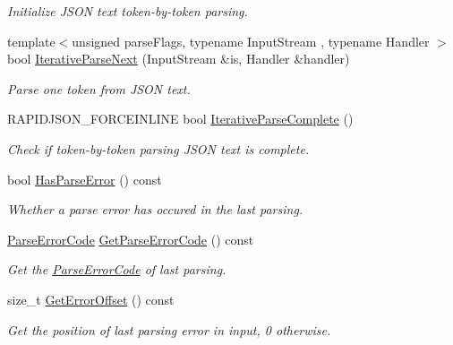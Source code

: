 \begin{DoxyCompactItemize}
\begin{DoxyCompactList}\small\item\em Initialize J\+S\+ON text token-\/by-\/token parsing. \end{DoxyCompactList}\item 
{\footnotesize template$<$unsigned parse\+Flags, typename Input\+Stream , typename Handler $>$ }\\bool \hyperlink{classGenericReader_a257891331e0c259903e7066fb4cebf92}{Iterative\+Parse\+Next} (Input\+Stream \&is, Handler \&handler)
\begin{DoxyCompactList}\small\item\em Parse one token from J\+S\+ON text. \end{DoxyCompactList}\item 
R\+A\+P\+I\+D\+J\+S\+O\+N\+\_\+\+F\+O\+R\+C\+E\+I\+N\+L\+I\+NE bool \hyperlink{classGenericReader_a835802fb87b44a09a8184785ed3b9213}{Iterative\+Parse\+Complete} ()
\begin{DoxyCompactList}\small\item\em Check if token-\/by-\/token parsing J\+S\+ON text is complete. \end{DoxyCompactList}\item 
bool \hyperlink{classGenericReader_aa9d10652062557ebf26cf414bfeabf84}{Has\+Parse\+Error} () const \hypertarget{classGenericReader_aa9d10652062557ebf26cf414bfeabf84}{}\label{classGenericReader_aa9d10652062557ebf26cf414bfeabf84}

\begin{DoxyCompactList}\small\item\em Whether a parse error has occured in the last parsing. \end{DoxyCompactList}\item 
\hyperlink{group__RAPIDJSON__ERRORS_ga8d4b32dfc45840bca189ade2bbcb6ba7}{Parse\+Error\+Code} \hyperlink{classGenericReader_ac45a26246877c4daa85021ae67caa017}{Get\+Parse\+Error\+Code} () const \hypertarget{classGenericReader_ac45a26246877c4daa85021ae67caa017}{}\label{classGenericReader_ac45a26246877c4daa85021ae67caa017}

\begin{DoxyCompactList}\small\item\em Get the \hyperlink{group__RAPIDJSON__ERRORS_ga8d4b32dfc45840bca189ade2bbcb6ba7}{Parse\+Error\+Code} of last parsing. \end{DoxyCompactList}\item 
size\+\_\+t \hyperlink{classGenericReader_a77399ac40cca1fb113a2d507f476b4e7}{Get\+Error\+Offset} () const \hypertarget{classGenericReader_a77399ac40cca1fb113a2d507f476b4e7}{}\label{classGenericReader_a77399ac40cca1fb113a2d507f476b4e7}

\begin{DoxyCompactList}\small\item\em Get the position of last parsing error in input, 0 otherwise. \end{DoxyCompactList}\end{DoxyCompactItemize}
